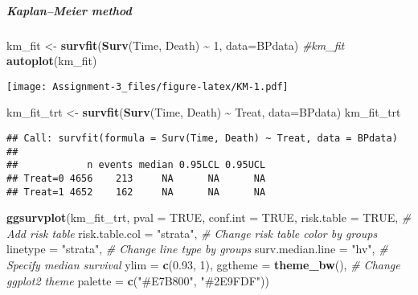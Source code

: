\documentclass[
]{article}
\newenvironment{Shaded}{\begin{snugshade}}{\end{snugshade}}
\newcommand{\AttributeTok}[1]{\textcolor[rgb]{0.13,0.29,0.53}{#1}}
\newcommand{\CommentTok}[1]{\textcolor[rgb]{0.56,0.35,0.01}{\textit{#1}}}
\newcommand{\ConstantTok}[1]{\textcolor[rgb]{0.56,0.35,0.01}{#1}}
\newcommand{\DecValTok}[1]{\textcolor[rgb]{0.00,0.00,0.81}{#1}}
\newcommand{\FloatTok}[1]{\textcolor[rgb]{0.00,0.00,0.81}{#1}}
\newcommand{\FunctionTok}[1]{\textcolor[rgb]{0.13,0.29,0.53}{\textbf{#1}}}
\newcommand{\NormalTok}[1]{#1}
\newcommand{\OtherTok}[1]{\textcolor[rgb]{0.56,0.35,0.01}{#1}}
\newcommand{\SpecialCharTok}[1]{\textcolor[rgb]{0.81,0.36,0.00}{\textbf{#1}}}
\newcommand{\StringTok}[1]{\textcolor[rgb]{0.31,0.60,0.02}{#1}}
\begin{document}
\newpage

\subparagraph{Kaplan--Meier method}\label{kaplanmeier-method}

\begin{Shaded}
\begin{Highlighting}[]
\NormalTok{km\_fit }\OtherTok{\textless{}{-}} \FunctionTok{survfit}\NormalTok{(}\FunctionTok{Surv}\NormalTok{(Time, Death) }\SpecialCharTok{\textasciitilde{}} \DecValTok{1}\NormalTok{, }\AttributeTok{data=}\NormalTok{BPdata)}
\CommentTok{\#km\_fit}
\FunctionTok{autoplot}\NormalTok{(km\_fit)}
\end{Highlighting}
\end{Shaded}

\texttt{[image: Assignment-3\_files/figure-latex/KM-1.pdf]}

\begin{Shaded}
\begin{Highlighting}[]
\NormalTok{km\_fit\_trt }\OtherTok{\textless{}{-}} \FunctionTok{survfit}\NormalTok{(}\FunctionTok{Surv}\NormalTok{(Time, Death) }\SpecialCharTok{\textasciitilde{}}\NormalTok{ Treat, }\AttributeTok{data=}\NormalTok{BPdata)}
\NormalTok{km\_fit\_trt}
\end{Highlighting}
\end{Shaded}

\begin{verbatim}
## Call: survfit(formula = Surv(Time, Death) ~ Treat, data = BPdata)
## 
##            n events median 0.95LCL 0.95UCL
## Treat=0 4656    213     NA      NA      NA
## Treat=1 4652    162     NA      NA      NA
\end{verbatim}

\begin{Shaded}
\begin{Highlighting}[]
\FunctionTok{ggsurvplot}\NormalTok{(km\_fit\_trt,}
           \AttributeTok{pval =} \ConstantTok{TRUE}\NormalTok{, }\AttributeTok{conf.int =} \ConstantTok{TRUE}\NormalTok{,}
           \AttributeTok{risk.table =} \ConstantTok{TRUE}\NormalTok{, }\CommentTok{\# Add risk table}
           \AttributeTok{risk.table.col =} \StringTok{"strata"}\NormalTok{, }\CommentTok{\# Change risk table color by groups}
           \AttributeTok{linetype =} \StringTok{"strata"}\NormalTok{, }\CommentTok{\# Change line type by groups}
           \AttributeTok{surv.median.line =} \StringTok{"hv"}\NormalTok{, }\CommentTok{\# Specify median survival}
           \AttributeTok{ylim =} \FunctionTok{c}\NormalTok{(}\FloatTok{0.93}\NormalTok{, }\DecValTok{1}\NormalTok{),}
           \AttributeTok{ggtheme =} \FunctionTok{theme\_bw}\NormalTok{(), }\CommentTok{\# Change ggplot2 theme}
           \AttributeTok{palette =} \FunctionTok{c}\NormalTok{(}\StringTok{"\#E7B800"}\NormalTok{, }\StringTok{"\#2E9FDF"}\NormalTok{))}
\end{Highlighting}
\end{Shaded}
\end{document}
